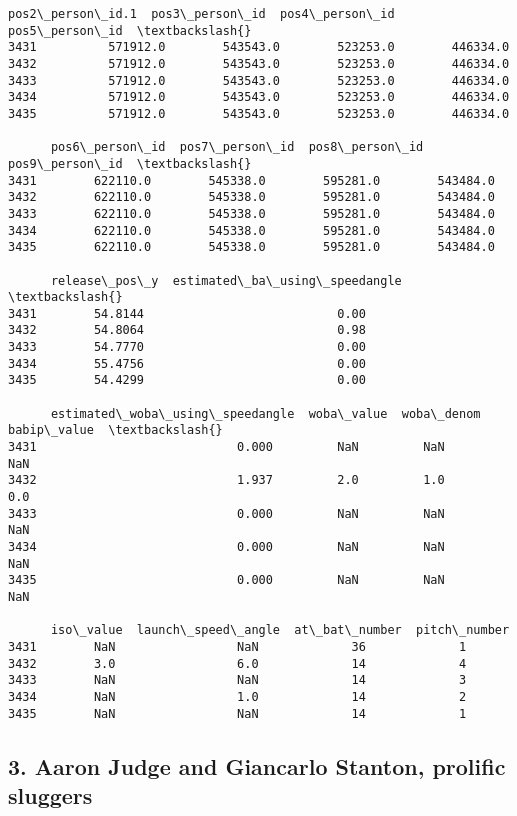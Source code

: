 \documentclass[11pt]{article}
\begin{document}
\begin{Verbatim}[commandchars=\\\{\}]
      pos2\_person\_id.1  pos3\_person\_id  pos4\_person\_id  pos5\_person\_id  \textbackslash{}
3431          571912.0        543543.0        523253.0        446334.0   
3432          571912.0        543543.0        523253.0        446334.0   
3433          571912.0        543543.0        523253.0        446334.0   
3434          571912.0        543543.0        523253.0        446334.0   
3435          571912.0        543543.0        523253.0        446334.0   

      pos6\_person\_id  pos7\_person\_id  pos8\_person\_id  pos9\_person\_id  \textbackslash{}
3431        622110.0        545338.0        595281.0        543484.0   
3432        622110.0        545338.0        595281.0        543484.0   
3433        622110.0        545338.0        595281.0        543484.0   
3434        622110.0        545338.0        595281.0        543484.0   
3435        622110.0        545338.0        595281.0        543484.0   

      release\_pos\_y  estimated\_ba\_using\_speedangle  \textbackslash{}
3431        54.8144                           0.00   
3432        54.8064                           0.98   
3433        54.7770                           0.00   
3434        55.4756                           0.00   
3435        54.4299                           0.00   

      estimated\_woba\_using\_speedangle  woba\_value  woba\_denom  babip\_value  \textbackslash{}
3431                            0.000         NaN         NaN          NaN   
3432                            1.937         2.0         1.0          0.0   
3433                            0.000         NaN         NaN          NaN   
3434                            0.000         NaN         NaN          NaN   
3435                            0.000         NaN         NaN          NaN   

      iso\_value  launch\_speed\_angle  at\_bat\_number  pitch\_number  
3431        NaN                 NaN             36             1  
3432        3.0                 6.0             14             4  
3433        NaN                 NaN             14             3  
3434        NaN                 1.0             14             2  
3435        NaN                 NaN             14             1  

    \end{Verbatim}

    \hypertarget{aaron-judge-and-giancarlo-stanton-prolific-sluggers}{%
\subsection{3. Aaron Judge and Giancarlo Stanton, prolific
sluggers}\label{aaron-judge-and-giancarlo-stanton-prolific-sluggers}}
\end{document}
